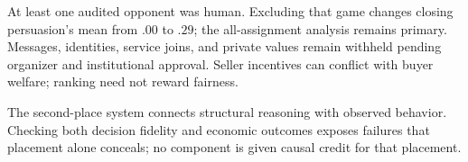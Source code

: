 \documentclass{article}
\newif\iftechnicalappendix
\begin{document}
At least one audited opponent was human. Excluding that game changes closing
persuasion's mean from $.00$ to $.29$; the all-assignment analysis remains
primary. Messages, identities, service joins, and private values remain withheld
pending organizer and institutional approval. Seller incentives can conflict
with buyer welfare; ranking need not reward fairness.

The second-place system connects structural reasoning with observed behavior.
Checking both decision fidelity and economic outcomes exposes failures that
placement alone conceals; no component is given causal credit for that placement.

\clearpage



\iftechnicalappendix
\clearpage
\appendix

\fi
\end{document}
